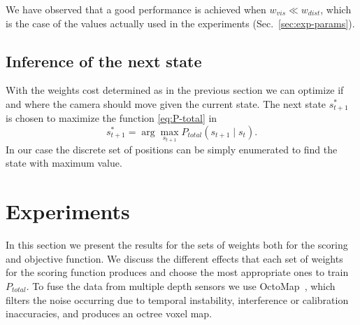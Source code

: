\documentclass[10pt,twocolumn,letterpaper]{article}
\begin{document}
We have observed that a good performance is achieved when $w_{vis} \ll w_{dist}$, which is the case of the values actually used in the experiments (Sec.~\ref{sec:exp-params}).


\subsection{Inference of the next state}
With the weights cost determined as in the previous section we can optimize if and where the camera should move given the current state. 
The next state $s^{\ast}_{t+1}$ is chosen to maximize the function \eqref{eq:P-total} in
\begin{equation}
  s^{\ast}_{t+1} = \arg\max_{s_{t+1}} P_{total}(s_{t+1}\mid s_{t}). 
  \label{eq:optimization}
\end{equation}
In our case the discrete set of positions can be simply enumerated to find the state with maximum value.

\section{Experiments}\label{sec:exp}
In this section we present the results for the sets of weights both for the scoring and objective function. 
We discuss the different effects that each set of weights for the scoring function produces and choose the most appropriate ones to train $P_{total}$. 
To fuse the data from multiple depth sensors we use OctoMap~\cite{Hornung2013}, which filters the noise occurring due to temporal instability, interference or calibration inaccuracies, and produces an octree voxel map. 
\end{document}
